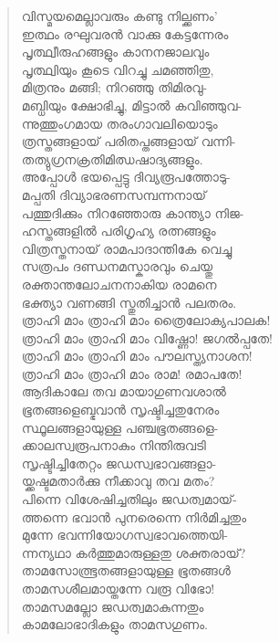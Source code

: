 \begin{verse}
വിസ്മയമെല്ലാവരും കണ്ടു നില്ക്കണം’\\
ഇത്ഥം രഘുവരന്‍ വാക്കു കേട്ടന്നേരം\\
പൃത്ഥ്വീരുഹങ്ങളും കാനനജാലവും\\
പൃത്ഥ്വിയും കൂടെ വിറച്ചു ചമഞ്ഞിതു,\\
മിത്രനും മങ്ങി; നിറഞ്ഞു തിമിരവു-\\
മബ്ധിയും ക്ഷോഭിച്ചു, മിട്ടാല്‍ കവിഞ്ഞുവ-\\
ന്നുത്തുംഗമായ തരംഗാവലിയൊടും\\
ത്രസ്തങ്ങളായ് പരിതപ്തങ്ങളായ് വന്നി-\\
തത്യുഗ്രനക്രതിമിഝഷാദ്യങ്ങളും.\\
അപ്പോള്‍ ഭയപ്പെട്ടു ദിവ്യരൂപത്തോടു-\\
മപ്പതി ദിവ്യാഭരണസമ്പന്നനായ്\\
പത്തുദിക്കും നിറഞ്ഞോരു കാന്ത്യാ നിജ-\\
ഹസ്തങ്ങളില്‍ പരിഗൃഹ്യ രത്നങ്ങളും\\
വിത്രസ്തനായ് രാമപാദാന്തികേ വെച്ചു\\
സത്രപം ദണ്ഡനമസ്കാരവും ചെയ്തു\\
രക്താന്തലോചനനാകിയ രാമനെ\\
ഭക്ത്യാ വണങ്ങി സ്തുതിച്ചാന്‍ പലതരം.\\
ത്രാഹി മാം ത്രാഹി മാം ത്രൈലോക്യപാലക!\\
ത്രാഹി മാം ത്രാഹി മാം വിഷ്ണോ! ജഗല്‍പ്പതേ!\\
ത്രാഹി മാം ത്രാഹി മാം പൗലസ്ത്യനാശന!\\
ത്രാഹി മാം ത്രാഹി മാം രാമ! രമാപതേ!\\
ആദികാലേ തവ മായാഗുണവശാല്‍\\
ഭൂതങ്ങളെബ്ഭവാന്‍ സൃഷ്ടിച്ചതുനേരം\\
സ്ഥൂലങ്ങളായുള്ള പഞ്ചഭൂതങ്ങളെ-\\
ക്കാലസ്വരൂപനാകും നിന്തിരുവടി\\
സൃഷ്ടിച്ചിതേറ്റം ജഡസ്വഭാവങ്ങളാ-\\
യ്ക്കഷ്ടമതാര്‍ക്കു നീക്കാവു തവ മതം?\\
പിന്നെ വിശേഷിച്ചതിലും ജഡത്വമായ്-\\
ത്തന്നെ ഭവാന്‍ പുനരെന്നെ നിര്‍മിച്ചതും\\
മുന്നേ ഭവന്നിയോഗസ്വഭാവത്തെയി-\\
ന്നന്യഥാ കര്‍ത്തുമാരുള്ളതു ശക്തരായ്?\\
താമസോത്ഭൂതങ്ങളായുള്ള ഭൂതങ്ങള്‍\\
താമസശീലമായ്തന്നേ വരൂ വിഭോ!\\
താമസമല്ലോ ജഡത്വമാകുന്നതും\\
കാമലോഭാദികളും താമസഗുണം.\\

\end{verse}
